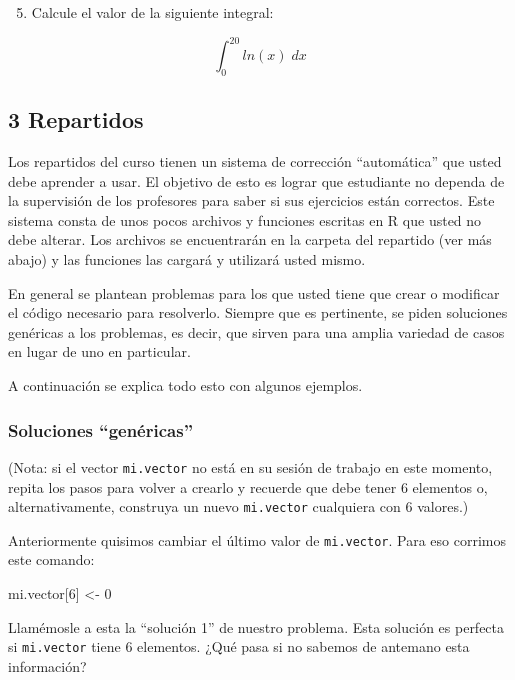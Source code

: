 \documentclass[]{article}
\newenvironment{Shaded}{}{}
\newcommand{\DecValTok}[1]{\textcolor[rgb]{0.25,0.63,0.44}{{#1}}}
\newcommand{\NormalTok}[1]{{#1}}
\begin{document}
\begin{enumerate}[1.]
\setcounter{enumi}{4}
\item
  Calcule el valor de la siguiente integral:
\end{enumerate}
\[
  \int_{0} ^{20} ln(x) \; dx
\]

\subsection{3 Repartidos}

Los repartidos del curso tienen un sistema de corrección ``automática''
que usted debe aprender a usar. El objetivo de esto es lograr que
estudiante no dependa de la supervisión de los profesores para saber si
sus ejercicios están correctos. Este sistema consta de unos pocos
archivos y funciones escritas en R que usted no debe alterar. Los
archivos se encuentrarán en la carpeta del repartido (ver más abajo) y
las funciones las cargará y utilizará usted mismo.

En general se plantean problemas para los que usted tiene que crear o
modificar el código necesario para resolverlo. Siempre que es
pertinente, se piden soluciones genéricas a los problemas, es decir, que
sirven para una amplia variedad de casos en lugar de uno en particular.

A continuación se explica todo esto con algunos ejemplos.

\subsubsection{Soluciones ``genéricas''}

(Nota: si el vector \texttt{mi.vector} no está en su sesión de trabajo
en este momento, repita los pasos para volver a crearlo y recuerde que
debe tener 6 elementos o, alternativamente, construya un nuevo
\texttt{mi.vector} cualquiera con 6 valores.)

Anteriormente quisimos cambiar el último valor de \texttt{mi.vector}.
Para eso corrimos este comando:

\begin{Shaded}
\begin{Highlighting}[]
\NormalTok{mi.vector[}\DecValTok{6}\NormalTok{] <- }\DecValTok{0}
\end{Highlighting}
\end{Shaded}
Llamémosle a esta la ``solución 1'' de nuestro problema. Esta solución
es perfecta si \texttt{mi.vector} tiene 6 elementos. ¿Qué pasa si no
sabemos de antemano esta información?
\end{document}
